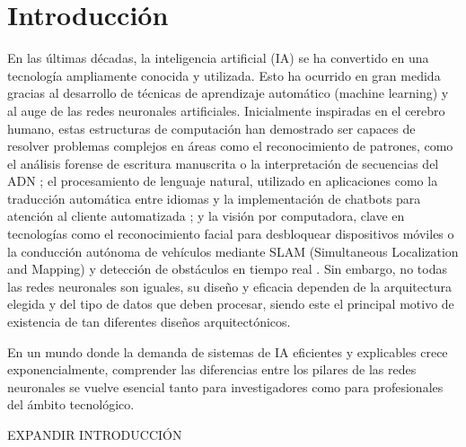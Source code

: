 \chapter{Introducción}\label{cap:introduccion}

En las últimas décadas, la inteligencia artificial (IA) se ha convertido en una tecnología ampliamente conocida y utilizada. Esto ha ocurrido en gran medida gracias al desarrollo de técnicas de aprendizaje automático (machine learning) y al auge de las redes neuronales artificiales. Inicialmente inspiradas en el cerebro humano, estas estructuras de computación han demostrado ser capaces de resolver problemas complejos en áreas como el reconocimiento de patrones, como el análisis forense de escritura manuscrita \cite{examples_nn__kulik_2009} o la interpretación de secuencias del ADN \cite{nn_dna_sequences__snyder_1993}; el procesamiento de lenguaje natural, utilizado en aplicaciones como la traducción automática entre idiomas \cite{machine_translation__mahata_2019} y la implementación de chatbots para atención al cliente automatizada \cite{chatbot_customer_service__nuruzzaman_2018}; y la visión por computadora, clave en tecnologías como el reconocimiento facial para desbloquear dispositivos móviles \cite{conv_nn_face_recog__chowanda_2019} o la conducción autónoma de vehículos mediante SLAM (Simultaneous Localization and Mapping) y detección de obstáculos en tiempo real \cite{slam_vehicles__saleem_2023}. Sin embargo, no todas las redes neuronales son iguales, su diseño y eficacia dependen de la arquitectura elegida y del tipo de datos que deben procesar, siendo este el principal motivo de existencia de tan diferentes diseños arquitectónicos.

En un mundo donde la demanda de sistemas de IA eficientes y explicables crece exponencialmente, comprender las diferencias entre los pilares de las redes neuronales se vuelve esencial tanto para investigadores como para profesionales del ámbito tecnológico.

{\color{red} EXPANDIR INTRODUCCIÓN}